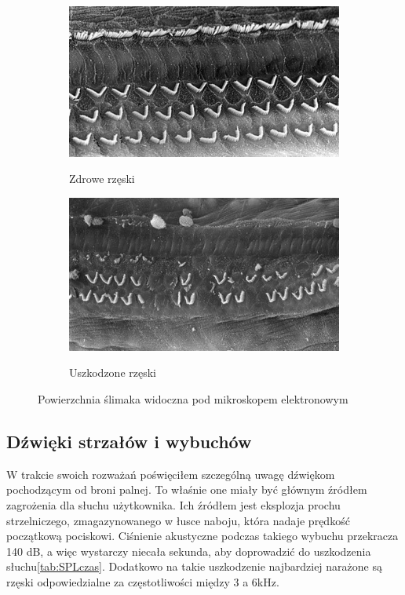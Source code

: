 \begin{figure}[H]
    \centering
    \begin{subfigure}{.45\textwidth}
        \centering
        \includegraphics[scale=0.45]{zdjecia/cochlee-normale.jpg}
        \label{normal_cochlea}
        \caption{Zdrowe rzęski}
    \end{subfigure}
    \begin{subfigure}{.45\textwidth}
        \centering
        \includegraphics[scale=0.44]{zdjecia/traumatisme-sonore-niveau-2.jpg}
        \label{damaged_cochlea}
        \caption{Uszkodzone rzęski}
    \end{subfigure}
    \caption{Powierzchnia ślimaka widoczna pod mikroskopem elektronowym\cite{RzeskiMikorskop}}
\end{figure}


\subsection{Dźwięki strzałów i wybuchów}

W trakcie swoich rozważań poświęciłem szczególną uwagę dźwiękom pochodzącym od broni palnej. To właśnie one miały być głównym źródłem zagrożenia dla słuchu użytkownika. 
Ich źródłem jest eksplozja prochu strzelniczego, zmagazynowanego w łusce naboju, która nadaje prędkość początkową pociskowi. Ciśnienie akustyczne podczas takiego wybuchu przekracza 140 dB, a więc wystarczy niecała sekunda, aby doprowadzić do uszkodzenia słuchu\ref{tab:SPLczas}. Dodatkowo na takie uszkodzenie najbardziej narażone są rzęski odpowiedzialne za częstotliwości między 3 a 6kHz\cite{BadaniePolicjantow}. 

